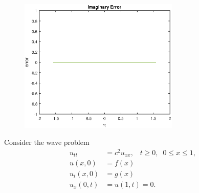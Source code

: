 \begin{figure}[ht]
\includegraphics[width=3in]{imag_err2}
\end{figure}

\item Consider the wave problem
\begin{align*}
u_{tt}&=c^2u_{xx},\;\;\; t\geq 0,\;\; 0\leq x\leq 1,\\
u(x,0)&=f(x)\\
u_t(x,0)&=g(x)\\
u_x(0,t)&=u(1,t)=0.
\end{align*}

